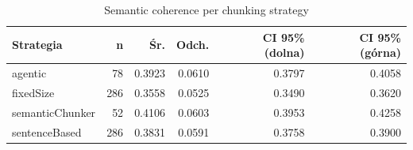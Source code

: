 \begin{table}[H]
    \centering
    \caption{Semantic coherence per chunking strategy}
    \small
    \begin{tabular}{@{}lrrrrr@{}}
        \toprule
        \textbf{Strategia} & \textbf{n} & \textbf{Śr.} & \textbf{Odch.} & \textbf{CI 95\% (dolna)} & \textbf{CI 95\% (górna)} \\
        \midrule
        agentic & 78 & 0.3923 & 0.0610 & 0.3797 & 0.4058 \\
        fixedSize & 286 & 0.3558 & 0.0525 & 0.3490 & 0.3620 \\
        semanticChunker & 52 & 0.4106 & 0.0603 & 0.3953 & 0.4258 \\
        sentenceBased & 286 & 0.3831 & 0.0591 & 0.3758 & 0.3900 \\
        \bottomrule
    \end{tabular}
\end{table}
